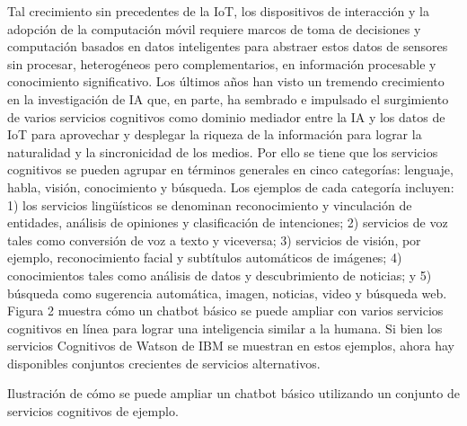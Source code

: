 Tal crecimiento sin precedentes de la IoT, los dispositivos de interacción y la adopción de la computación móvil requiere marcos de toma de decisiones y computación basados ​​en datos inteligentes para abstraer estos datos de sensores sin procesar, heterogéneos pero complementarios, en información procesable y conocimiento significativo. Los últimos años han visto un tremendo crecimiento en la investigación de IA que, en parte, ha sembrado e impulsado el surgimiento de varios servicios cognitivos como dominio mediador entre la IA y los datos de IoT para aprovechar y desplegar la riqueza de la información para lograr la naturalidad y la sincronicidad de los medios.
Por ello se tiene que los servicios cognitivos se pueden agrupar en términos generales en cinco categorías: lenguaje, habla, visión, conocimiento y búsqueda. Los ejemplos de cada categoría incluyen: 1) los servicios lingüísticos se denominan reconocimiento y vinculación de entidades, análisis de opiniones y clasificación de intenciones; 2) servicios de voz tales como conversión de voz a texto y viceversa; 3) servicios de visión, por ejemplo, reconocimiento facial y subtítulos automáticos de imágenes; 4) conocimientos tales como análisis de datos y descubrimiento de noticias; y 5) búsqueda como sugerencia automática, imagen, noticias, video y búsqueda web.  Figura 2 muestra
 cómo un chatbot básico se puede ampliar con varios servicios cognitivos en línea para lograr una inteligencia similar a la humana. Si bien los servicios Cognitivos de Watson de IBM se muestran en estos ejemplos, ahora hay disponibles conjuntos crecientes de servicios alternativos.

{\color{red}Ilustración de cómo se puede ampliar un chatbot básico utilizando un conjunto de servicios cognitivos de ejemplo.}

